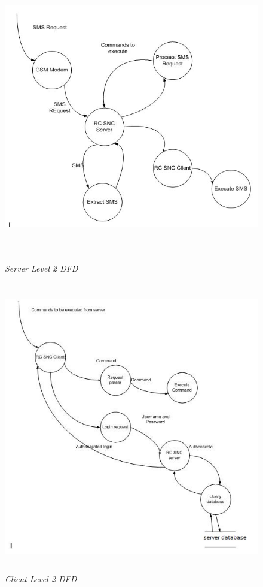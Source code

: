 \newpage
\begin{figure}[h!]
\centering
\includegraphics[height=5in, width = 5in]{pic3.jpg}
\caption{\emph{Server Level 2 DFD}}
\label{fig:1}
\end{figure}
\newpage
\begin{figure}[h!]
\centering
\includegraphics[height=5in, width = 5in]{pic4.jpg}
\caption{\emph{Client Level 2 DFD}}
\label{fig:1}
\end{figure}
\newpage

